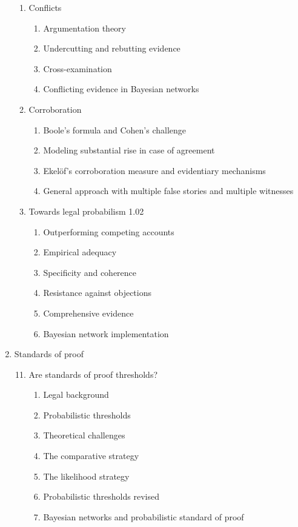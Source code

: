 \documentclass[
  10pt,
  dvipsnames,enabledeprecatedfontcommands]{scrartcl}
\begin{document}
\begin{multicols}{2}
\begin{enumerate}
\begin{enumerate}
  
  \item Conflicts
  \begin{enumerate}
  \item Argumentation theory
  \item Undercutting and rebutting evidence
  \item Cross-examination
  \item Conflicting evidence in Bayesian networks
  \end{enumerate}
 
 
  \item Corroboration
  \begin{enumerate}
  \item Boole's formula and Cohen's challenge
  \item  Modeling substantial rise in case of agreement
  \item Ekel\"of's corroboration measure and evidentiary mechanisms
  \item General approach with multiple false stories and multiple witnesses
  \end{enumerate}


  \item  Towards legal probabilism 1.02
    \begin{enumerate}
    \item Outperforming competing accounts
    \item Empirical adequacy
    \item Specificity and coherence
    \item Resistance against objections 
    \item Comprehensive evidence
    \item Bayesian network implementation
    \end{enumerate}


\end{enumerate}
\item  Standards of proof
\begin{enumerate}


\setcounter{enumii}{10}
 \item  Are standards of proof thresholds?
  \begin{enumerate}
  \item  Legal background
  \item  Probabilistic thresholds
  \item  Theoretical challenges
  \item  The comparative strategy
  \item  The likelihood strategy
  \item  Probabilistic thresholds revised
  \item  Bayesian networks and probabilistic standard of proof
  \end{enumerate}



\end{enumerate}
\end{enumerate}
\end{multicols}
\end{document}
